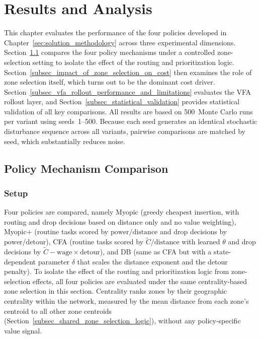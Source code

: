 \documentclass[12pt,oneside]{article}
\begin{document}
\section{Results and Analysis}\label{sec:results_analysis}

This chapter evaluates the performance of the four policies developed in Chapter~\ref{sec:solution_methodology} across three experimental dimensions. Section~\ref{subsec_policy_mechanism_comparison} compares the four policy mechanisms under a controlled zone-selection setting to isolate the effect of the routing and prioritization logic. Section~\ref{subsec_impact_of_zone_selection_on_cost} then examines the role of zone selection itself, which turns out to be the dominant cost driver. Section~\ref{subsec_vfa_rollout_performance_and_limitations} evaluates the VFA rollout layer, and Section~\ref{subsec_statistical_validation} provides statistical validation of all key comparisons. All results are based on 500~Monte Carlo runs per variant using seeds~1--500. Because each seed generates an identical stochastic disturbance sequence across all variants, pairwise comparisons are matched by seed, which substantially reduces noise.

\subsection{Policy Mechanism Comparison}\label{subsec_policy_mechanism_comparison}

\subsubsection*{Setup}

Four policies are compared, namely Myopic (greedy cheapest insertion, with routing and drop decisions based on distance only and no value weighting), Myopic+ (routine tasks scored by $\text{power}/\text{distance}$ and drop decisions by $\text{power}/\text{detour}$), CFA (routine tasks scored by $\tilde{C}/\text{distance}$ with learned $\theta$ and drop decisions by $\tilde{C} - \text{wage} \times \text{detour}$), and DB (same as CFA but with a state-dependent parameter $\delta$ that scales the distance exponent and the detour penalty). To isolate the effect of the routing and prioritization logic from zone-selection effects, all four policies are evaluated under the same centrality-based zone selection in this section. Centrality ranks zones by their geographic centrality within the network, measured by the mean distance from each zone's centroid to all other zone centroids (Section~\ref{subsec_shared_zone_selection_logic}), without any policy-specific value signal.
\end{document}
